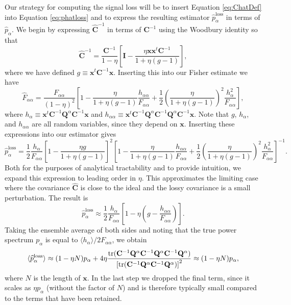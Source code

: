 \documentclass[preprint2,numberedappendix,tighten]{aastex6}  %
\newcommand{\x}{\mathbf{x}}
\newcommand{\C}{\mathbf{C}}
\newcommand{\Chat}{\mathbf{\widehat{C}}}
\newcommand{\Q}{\mathbf{Q}}
\newcommand{\I}{\mathbf{I}}
\begin{document}
Our strategy for computing the signal loss will be to insert Equation \eqref{eq:ChatDef} into Equation \eqref{eq:phatloss} and to express the resulting estimator $\widehat{p}_\alpha^\textrm{loss}$ in terms of $\widehat{p}_\alpha$. We begin by expressing $\Chat^{-1}$ in terms of $\C^{-1}$ using the Woodbury identity so that
\begin{equation}
\Chat^{-1} = \frac{\C^{-1}}{1-\eta} \left[ \I - \frac{\eta \x \x^t \C^{-1}}{1+ \eta (g-1)}\right],
\end{equation}
where we have defined $g \equiv \x^t \C^{-1} \x$. Inserting this into our Fisher estimate we have
\begin{equation}
\widehat{F}_{\alpha \alpha} = \frac{F_{\alpha \alpha}}{(1-\eta)^2} \left[ 1 -\frac{\eta }{1+ \eta (g-1)} \frac{h_{\alpha \alpha}}{F_{\alpha \alpha}} + \frac{1}{2} \left( \frac{\eta }{1+ \eta (g-1)} \right)^2 \frac{h_\alpha^2}{F_{\alpha \alpha}}\right],
\end{equation}
where $h_\alpha \equiv \x^t \C^{-1} \Q^\alpha \C^{-1} \x $ and $h_{\alpha \alpha} \equiv \x^t \C^{-1} \Q^\alpha \C^{-1} \Q^\alpha \C^{-1}\x $. Note that $g$, $h_\alpha$, and $h_{\alpha \alpha}$ are all random variables, since they depend on $\x$. Inserting these expressions into our estimator gives
\begin{equation}
\label{eq:phatlossexpanded}
\widehat{p}_\alpha^\textrm{loss} = \frac{1}{2} \frac{h_\alpha}{F_{\alpha \alpha}} \left[ 1 - \frac{\eta g}{1+ \eta (g-1)}\right]^2  \left[ 1 -\frac{\eta }{1+ \eta (g-1)} \frac{h_{\alpha \alpha}}{F_{\alpha \alpha}} + \frac{1}{2} \left( \frac{\eta }{1+ \eta (g-1)} \right)^2 \frac{h_\alpha^2}{F_{\alpha \alpha}}\right]^{-1}.
\end{equation}
Both for the purposes of analytical tractability and to provide intuition, we expand this expression to leading 
order in $\eta$. This approximates the limiting case where the covariance $\Chat$ is close to the ideal and the 
lossy covariance is a small perturbation.  The result is
\begin{equation}
\widehat{p}_\alpha^\textrm{loss} \approx \frac{1}{2} \frac{h_\alpha}{F_{\alpha \alpha}} \left[ 1 - \eta \left( g - \frac{h_{\alpha \alpha}}{F_{\alpha \alpha}}\right)\right].
\end{equation}
Taking the ensemble average of both sides and noting that the true power spectrum $p_\alpha$ is equal to $\langle h_\alpha \rangle / 2 F_{\alpha \alpha}$, we obtain
\begin{equation}
\langle \widehat{p}_\alpha^\textrm{loss} \rangle \approx (1- \eta N) p_\alpha + 4 \eta \frac{\rm{tr} (\C^{-1} \Q^\alpha \C^{-1} \Q^\alpha \C^{-1} \Q^\alpha )}{\left[ \rm{tr} (\C^{-1} \Q^\alpha \C^{-1} \Q^\alpha  ) \right]^2} \approx (1- \eta N) p_\alpha,
\end{equation}
where $N$ is the length of $\x$. In the last step we dropped the final term, since it scales as $\eta p_\alpha$ (without the factor of $N$) and is therefore typically small compared to the terms that have been retained.
\end{document}
